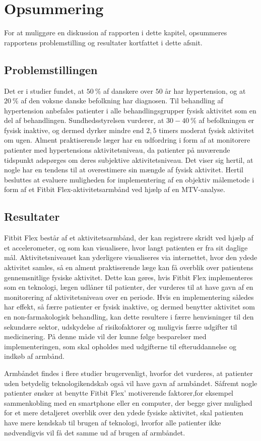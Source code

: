 \section{Opsummering}
For at muliggøre en diskussion af rapporten i dette kapitel, opsummeres rapportens problemstilling og resultater kortfattet i dette afsnit. 
\subsection{Problemstillingen}
Det er i studier fundet, at $50~\%$ af danskere over $50$ år har hypertension, og at $20~\%$ af den voksne danske befolkning har diagnosen. Til behandling af hypertension anbefales patienter i alle behandlingsgrupper fysisk aktivitet som en del af behandlingen. Sundhedsstyrelsen vurderer, at $30-40~\%$ af befolkningen er fysisk inaktive, og dermed dyrker mindre end $2,5$ timers moderat fysisk aktivitet om ugen. Alment praktiserende læger har en udfordring i form af at monitorere patienter med hypertensions aktivitetsniveau, da patienter på nuværende tidspunkt adspørges om deres subjektive aktivitetsniveau. Det viser sig hertil, at nogle har en tendens til at overestimere sin mængde af fysisk aktivitet. Hertil besluttes at evaluere muligheden for implementering af en objektiv målemetode i form af et Fitbit Flex-aktivitetsarmbånd ved hjælp af en MTV-analyse. 
\subsection{Resultater}
Fitbit Flex består af et aktivitetsarmbånd, der kan registrere skridt ved hjælp af et accelerometer, og som kan visualisere, hvor langt patienten er fra sit daglige mål. Aktivitetsniveauet kan yderligere visualiseres via internettet, hvor den ydede aktivitet samles, så en alment praktiserende læge kan få overblik over patientens gennemsnitlige fysiske aktivitet. Dette kan gøres, hvis Fitbit Flex implementeres som en teknologi, lægen udlåner til patienter, der vurderes til at have gavn af en monitorering af aktivitetsniveau over en periode. Hvis en implementering således har effekt, så færre patienter er fysisk inaktive, og dermed benytter aktivitet som en non-farmakologisk behandling, kan dette resultere i færre henvisninger til den sekundære sektor, udskydelse af risikofaktorer og muligvis færre udgifter til medicinering. På denne måde vil der kunne følge besparelser med implementeringen, som skal opholdes med udgifterne til efteruddannelse og indkøb af armbånd. 

Armbåndet findes i flere studier brugervenligt, hvorfor det vurderes, at patienter uden betydelig teknologikendskab også vil have gavn af armbåndet. Såfremt nogle patienter ønsker at benytte Fitbit Flex' motiverende faktorer,for eksempel sammenkobling med en smartphone eller en computer, der begge giver mulighed for et mere detaljeret overblik over den ydede fysiske aktivitet, skal patienten have mere kendskab til brugen af teknologi, hvorfor alle patienter ikke nødvendigvis vil få det samme ud af brugen af armbåndet.